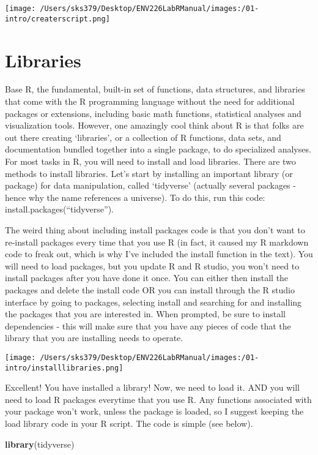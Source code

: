 \documentclass[
]{book}
\newenvironment{Shaded}{\begin{snugshade}}{\end{snugshade}}
\newcommand{\FunctionTok}[1]{\textcolor[rgb]{0.13,0.29,0.53}{\textbf{#1}}}
\newcommand{\NormalTok}[1]{#1}
\begin{document}
\texttt{[image: /Users/sks379/Desktop/ENV226LabRManual/images:/01-intro/createrscript.png]}

\hypertarget{libraries}{%
\section{Libraries}\label{libraries}}

Base R, the fundamental, built-in set of functions, data structures, and libraries that come with the R programming language without the need for additional packages or extensions, including basic math functions, statistical analyses and visualization tools. However, one amazingly cool think about R is that folks are out there creating `libraries', or a collection of R functions, data sets, and documentation bundled together into a single package, to do specialized analyses. For most tasks in R, you will need to install and load libraries. There are two methods to install libraries. Let's start by installing an important library (or package) for data manipulation, called `tidyverse' (actually several packages - hence why the name references a universe). To do this, run this code: install.packages(``tidyverse'').

The weird thing about including install packages code is that you don't want to re-install packages every time that you use R (in fact, it caused my R markdown code to freak out, which is why I've included the install function in the text). You will need to load packages, but you update R and R studio, you won't need to install packages after you have done it once. You can either then install the packages and delete the install code OR you can install through the R studio interface by going to packages, selecting install and searching for and installing the packages that you are interested in. When prompted, be sure to install dependencies - this will make sure that you have any pieces of code that the library that you are installing needs to operate.

\texttt{[image: /Users/sks379/Desktop/ENV226LabRManual/images:/01-intro/installlibraries.png]}

Excellent! You have installed a library! Now, we need to load it. AND you will need to load R packages everytime that you use R. Any functions associated with your package won't work, unless the package is loaded, so I suggest keeping the load library code in your R script. The code is simple (see below).

\begin{Shaded}
\begin{Highlighting}[]
\FunctionTok{library}\NormalTok{(tidyverse)}
\end{Highlighting}
\end{Shaded}
\end{document}
